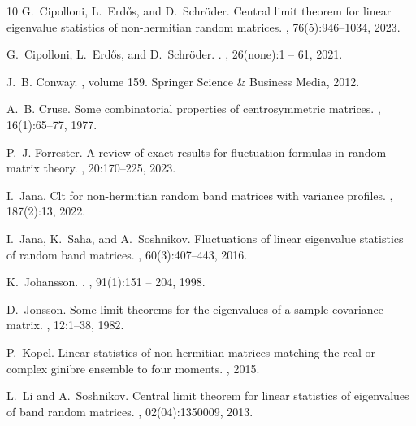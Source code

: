 \documentclass[12pt]{amsart}
\theoremstyle{plain}
\theoremstyle{definition}
\begin{document}
\begin{thebibliography}{10}
G.~Cipolloni, L.~Erd{\H{o}}s, and D.~Schr{\"o}der.
\newblock Central limit theorem for linear eigenvalue statistics of
  non-hermitian random matrices.
,
  76(5):946--1034, 2023.

G.~Cipolloni, L.~Erdős, and D.~Schr{\"o}der.
.
, 26(none):1 -- 61, 2021.

J.~B. Conway.
, volume 159.
\newblock Springer Science \& Business Media, 2012.

A.~B. Cruse.
\newblock Some combinatorial properties of centrosymmetric matrices.
, 16(1):65--77, 1977.

P.~J. Forrester.
\newblock A review of exact results for fluctuation formulas in random matrix
  theory.
, 20:170--225, 2023.

I.~Jana.
\newblock Clt for non-hermitian random band matrices with variance profiles.
, 187(2):13, 2022.

I.~Jana, K.~Saha, and A.~Soshnikov.
\newblock Fluctuations of linear eigenvalue statistics of random band matrices.
, 60(3):407--443,
  2016.

K.~Johansson.
.
, 91(1):151 -- 204, 1998.

D.~Jonsson.
\newblock Some limit theorems for the eigenvalues of a sample covariance
  matrix.
, 12:1--38, 1982.

P.~Kopel.
\newblock Linear statistics of non-hermitian matrices matching the real or
  complex ginibre ensemble to four moments.
, 2015.

L.~Li and A.~Soshnikov.
\newblock Central limit theorem for linear statistics of eigenvalues of band
  random matrices.
, 02(04):1350009, 2013.


\end{thebibliography}
\end{document}
